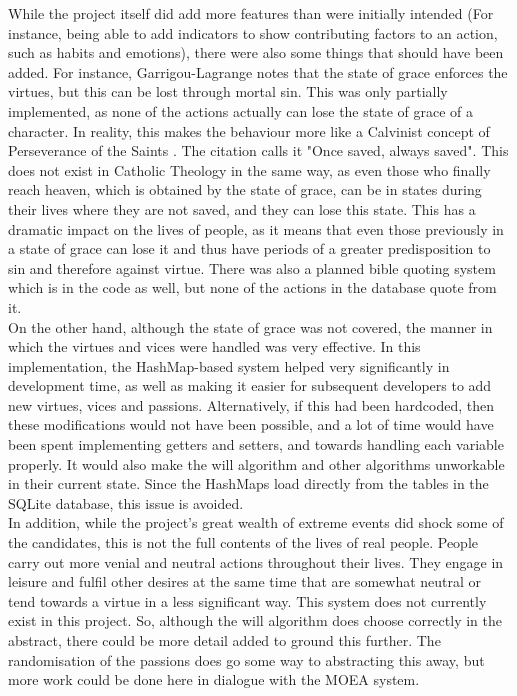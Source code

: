 \documentclass[11pt]{article}
\begin{document}
While the project itself did add more features than were initially intended (For instance, being able to add indicators to show contributing factors to an action, such as habits and emotions), there were also some things that should have been added. For instance, Garrigou-Lagrange notes that the state of grace enforces the virtues, but this can be lost through mortal sin. This was only partially implemented, as none of the actions actually can lose the state of grace of a character. In reality, this makes the behaviour more like a Calvinist concept of Perseverance of the Saints \cite{TULIPorT24:online}. The citation calls it "Once saved, always saved". This does not exist in Catholic Theology in the same way, as even those who finally reach heaven, which is obtained by the state of grace, can be in states during their lives where they are not saved, and they can lose this state. This has a dramatic impact on the lives of people, as it means that even those previously in a state of grace can lose it and thus have periods of a greater predisposition to sin and therefore against virtue. There was also a planned bible quoting system which is in the code as well, but none of the actions in the database quote from it.\\

On the other hand, although the state of grace was not covered, the manner in which the virtues and vices were handled was very effective. In this implementation, the HashMap-based system helped very significantly in development time, as well as making it easier for subsequent developers to add new virtues, vices and passions. Alternatively, if this had been hardcoded, then these modifications would not have been possible, and a lot of time would have been spent implementing getters and setters, and towards handling each variable properly. It would also make the will algorithm and other algorithms unworkable in their current state. Since the HashMaps load directly from the tables in the SQLite database, this issue is avoided.\\

In addition, while the project's great wealth of extreme events did shock some of the candidates, this is not the full contents of the lives of real people. People carry out more venial and neutral actions throughout their lives. They engage in leisure and fulfil other desires at the same time that are somewhat neutral or tend towards a virtue in a less significant way. This system does not currently exist in this project. So, although the will algorithm does choose correctly in the abstract, there could be more detail added to ground this further. The randomisation of the passions does go some way to abstracting this away, but more work could be done here in dialogue with the MOEA system.\\
\end{document}
